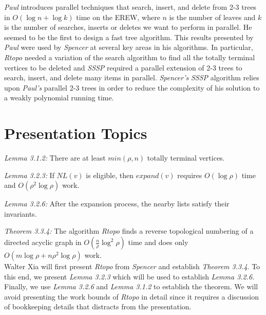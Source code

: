 \documentclass[paper=a4, fontsize=11pt]{scrartcl} %
\numberwithin{equation}{section} %
\numberwithin{figure}{section} %
\numberwithin{table}{section} %
\begin{document}
\textit{Paul\cite{P83}} introduces parallel techniques that search, insert, and delete from 2-3 trees in $O(\log{n} + \log{k})$ time on the EREW, where $n$ is the number of leaves and $k$ is the number of searches, inserts or deletes we want to perform in parallel. He seemed to be the first to design a fast tree algorithm. This results presented by \textit{Paul\cite{P83}} were used by \textit{Spencer\cite{S97}} at several key areas in his algorithms. In particular, \textit{Rtopo} needed a variation of the search algorithm to find all the totally terminal vertices to be deleted and \textit{SSSP} required a parallel extension of 2-3 trees to search, insert, and delete many items in parallel. \textit{Spencer's\cite{S97}} \textit{SSSP} algorithm relies upon \textit{Paul's\cite{P83}} parallel 2-3 trees in order to reduce the complexity of his solution to a weakly polynomial running time.



\section{Presentation Topics}
\hfill

\textit{Lemma 3.1.2:} There are at least $min(\rho,n)$ totally terminal vertices.

\textit{Lemma 3.2.3:} If $NL(v)$ is eligible, then $expand(v)$ requires $O(\log{\rho})$ time and $O(\rho^2\log{\rho})$ work.

\textit{Lemma 3.2.6:} After the expansion process, the nearby lists satisfy their invariants.

\textit{Theorem 3.3.4:} The algorithm \textit{Rtopo} finds a reverse topological numbering of a directed acyclic graph in $O(\frac{n}{\rho}\log^2{\rho})$ time and does only $O(m\log{\rho} + n\rho^2\log{\rho})$ work.\\

Walter Xia will first present \textit{Rtopo} from \textit{Spencer\cite{S97}} and establish \textit{Theorem 3.3.4}. To this end, we present \textit{Lemma 3.2.3} which will be used to establish \textit{Lemma 3.2.6}. Finally, we use \textit{Lemma 3.2.6} and \textit{Lemma 3.1.2} to establish the theorem. We will avoid presenting the work bounds of \textit{Rtopo} in detail since it requires a discussion of bookkeeping details that distracts from the presentation.\\
\end{document}
